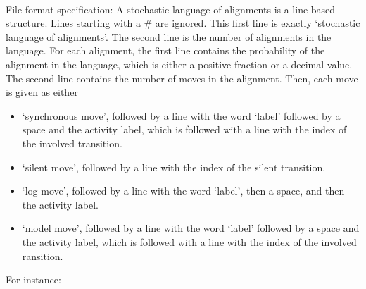 {\\File format specification:
A stochastic language of alignments is a line-based structure. Lines starting with a \# are ignored.
    This first line is exactly `stochastic language of alignments'.
    The second line is the number of alignments in the language.
    For each alignment, the first line contains the probability of the alignment in the language, which is either a positive fraction or a decimal value.
    The second line contains the number of moves in the alignment.
    Then, each move is given as either 
    \begin{itemize}
        \item `synchronous move', followed by a line with the word `label' followed by a space and the activity label, which is followed with a line with the index of the involved transition.
        \item `silent move', followed by a line with the index of the silent transition.
        \item `log move', followed by a line with the word `label', then a space, and then the activity label.
        \item `model move', followed by a line with the word `label' followed by a space and the activity label, which is followed with a line with the index of the involved ransition.
    \end{itemize}
    
    For instance:
    
\clearpage
}

